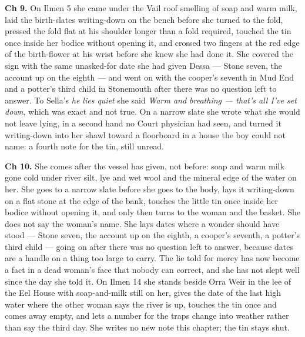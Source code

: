 \documentclass{design/chronicle}
\begin{document}
{\textbf{Ch 9.} On Ilmen 5 she came under the Vail roof smelling of soap and warm milk, laid the birth-slates writing-down on the bench before she turned to the fold, pressed the fold flat at his shoulder longer than a fold required, touched the tin once inside her bodice without opening it, and crossed two fingers at the red edge of the birth-flower at his wrist before she knew she had done it. She covered the sign with the same unasked-for date she had given Dessa --- Stone seven, the account up on the eighth --- and went on with the cooper’s seventh in Mud End and a potter’s third child in Stonemouth after there was no question left to answer. To Sella’s \emph{he lies quiet} she said \emph{Warm and breathing --- that’s all I’ve set down}, which was exact and not true. On a narrow slate she wrote what she would not leave lying, in a second hand no Court physician had seen, and turned it writing-down into her shawl toward a floorboard in a house the boy could not name: a fourth note for the tin, still unread.

\textbf{Ch 10.} She comes after the vessel has given, not before: soap and warm milk gone cold under river silt, lye and wet wool and the mineral edge of the water on her. She goes to a narrow slate before she goes to the body, lays it writing-down on a flat stone at the edge of the bank, touches the little tin once inside her bodice without opening it, and only then turns to the woman and the basket. She does not say the woman’s name. She lays dates where a wonder should have stood --- Stone seven, the account up on the eighth, a cooper’s seventh, a potter’s third child --- going on after there was no question left to answer, because dates are a handle on a thing too large to carry. The lie told for mercy has now become a fact in a dead woman’s face that nobody can correct, and she has not slept well since the day she told it. On Ilmen 14 she stands beside Orra Weir in the lee of the Eel House with soap-and-milk still on her, gives the date of the last high water where the other woman says the river is up, touches the tin once and comes away empty, and lets a number for the traps change into weather rather than say the third day. She writes no new note this chapter; the tin stays shut.

}
\end{document}
